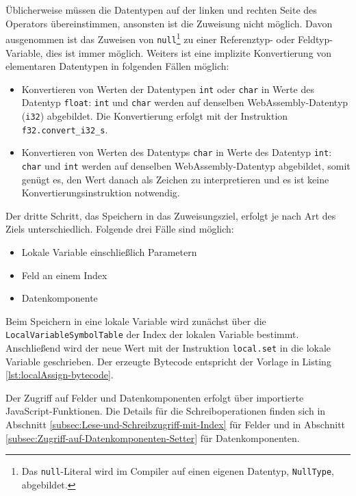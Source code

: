 Üblicherweise müssen die Datentypen auf der linken und rechten Seite des Operators übereinstimmen, ansonsten ist die Zuweisung nicht möglich. Davon ausgenommen ist das Zuweisen von \lstinline{null}\footnote{Das \lstinline{null}-Literal wird im Compiler auf einen eigenen Datentyp, \lstinline{NullType}, abgebildet.} zu einer Referenztyp- oder Feldtyp-Variable, dies ist immer möglich. Weiters ist eine implizite Konvertierung von elementaren Datentypen in folgenden Fällen möglich:
\begin{itemize}
    \item Konvertieren von Werten der Datentypen \lstinline{int} oder \lstinline{char} in Werte des Datentyp \lstinline{float}: \lstinline{int} und \lstinline{char} werden auf denselben WebAssembly-Datentyp (\lstinline{i32}) abgebildet. Die Konvertierung erfolgt mit der Instruktion \lstinline{f32.convert_i32_s}.
    \item Konvertieren von Werten des Datentyps \lstinline{char} in Werte des Datentyp \lstinline{int}: \lstinline{char} und \lstinline{int} werden auf denselben WebAssembly-Datentyp abgebildet, somit genügt es, den Wert danach als Zeichen zu interpretieren und es ist keine Konvertierungsinstruktion notwendig.
\end{itemize}

Der dritte Schritt, das Speichern in das Zuweisungsziel, erfolgt je nach Art des Ziels unterschiedlich. Folgende drei Fälle sind möglich:
\begin{itemize}
    \item Lokale Variable einschließlich Parametern
    \item Feld an einem Index
    \item Datenkomponente
\end{itemize}

Beim Speichern in eine lokale Variable wird zunächst über die \lstinline{LocalVariableSymbolTable} der Index der lokalen Variable bestimmt. Anschließend wird der neue Wert mit der Instruktion \lstinline{local.set} in die lokale Variable geschrieben. Der erzeugte Bytecode entspricht der Vorlage in Listing \ref{lst:localAssign-bytecode}.



Der Zugriff auf Felder und Datenkomponenten erfolgt über importierte JavaScript-Funktionen. Die Details für die Schreiboperationen finden sich in Abschnitt \ref{subsec:Lese-und-Schreibzugriff-mit-Index} für Felder und in Abschnitt \ref{subsec:Zugriff-auf-Datenkomponenten-Setter} für Datenkomponenten.

